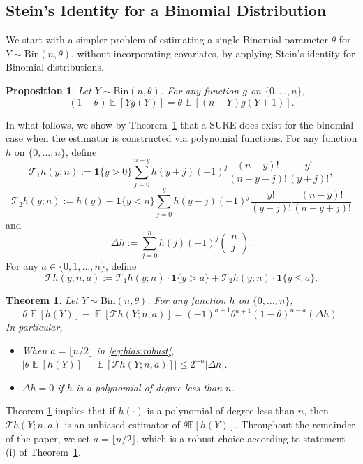 \documentclass[12pt,letterpaper]{article}
\newcommand{\com}[2]{
  \left(\begin{array}{cc}
    #1 \\ #2
  \end{array}\right)
}
\newcommand{\E}{\operatorname{\mathbb{E}}}
\newcommand{\T}{\mathcal{T}}
\newtheorem{theorem}{Theorem}[section]
\newtheorem{proposition}{Proposition}[section]
\begin{document}
\subsection{Stein's Identity for a Binomial Distribution}
We start with a simpler problem of estimating a single Binomial parameter $\theta$ for $Y \sim \mathrm{Bin}(n,\theta)$, without incorporating covariates, by applying Stein’s identity for Binomial distributions.
\begin{proposition}\label{prop:stein}
  Let $Y\sim \mathrm{Bin}(n, \theta)$. For any function $g$ on $\{0, \ldots, n\}$, 
  \[(1 - \theta)\E[Yg(Y)] = \theta \E[(n - Y)g(Y + 1)].\]
\end{proposition}

In what follows, we show by Theorem~\ref{thm:better} that a SURE does exist for the binomial case when the estimator is constructed via polynomial functions. For any function $h$ on $\{0, \ldots, n\}$, define 
  \begin{equation}
    \label{eq:T1}
    \T_1 h(y; n) := \mathbf{1}\{y > 0\}\sum_{j=0}^{n-y}h(y + j)(-1)^{j}\frac{(n-y)!}{(n-y-j)!}\frac{y!}{(y+j)!},
  \end{equation}
  \begin{equation}
    \label{eq:T2}
    \T_2 h(y; n) := h(y) - \mathbf{1}\{y < n\}\sum_{j=0}^{y}h(y - j)(-1)^{j}\frac{y!}{(y-j)!}\frac{(n - y)!}{(n-y+j)!}
  \end{equation}
  and
  \begin{equation}
      \label{eq:Deltah}
      \Delta h := \sum_{j=0}^{n}h(j)(-1)^{j}\com{n}{j}.
    \end{equation}
For any $a\in \{0, 1, \ldots, n\}$, define 
\begin{equation}
  \label{eq:T}
  \T h(y; n, a) := \T_1 h(y; n) \cdot \mathbf{1}\{y > a\} + \T_2 h(y; n) \cdot \mathbf{1}\{y \le a\}.
\end{equation}
\begin{theorem}\label{thm:better}
Let $Y\sim \mathrm{Bin}(n, \theta)$. For any function $h$ on $\{0, \ldots, n\}$,
  \begin{equation}\label{eq:bias:robust}
      \theta \E[h(Y)] - \E[\T h(Y; n, a)] = (-1)^{a+1}\theta^{a+1} (1 - \theta)^{n-a} (\Delta h).
  \end{equation} 
In particular,
\begin{itemize}
    \item[(i)] When $a=\lfloor n/2\rfloor$ in \eqref{eq:bias:robust}, $\left|\theta \E[h(Y)] - \E[\T h(Y; n, a)]\right|\leq2^{-n}|\Delta h|$.
    \item[(ii)] $\Delta h=0$ if $h$ is a polynomial of degree less than $n$.
\end{itemize}
\end{theorem}
Theorem \ref{thm:better} implies that if $h(\cdot)$ is a polynomial of degree less than $n$, then $\mathcal{T}h(Y;n,a)$ is an unbiased estimator of $\theta\mathbb{E}[h(Y)]$. Throughout the remainder of the paper, we set $a=\lfloor n/2\rfloor$, which is a robust choice according to statement (i) of Theorem~\ref{thm:better}. 
\end{document}
